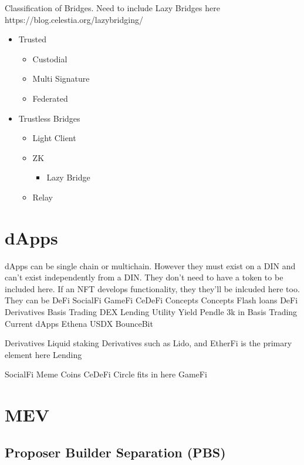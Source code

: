 \documentclass[
  letterpaper,
  DIV=11,
  numbers=noendperiod]{scrreprt}
\providecommand{\tightlist}{%
  \setlength{\itemsep}{0pt}\setlength{\parskip}{0pt}}\usepackage{longtable,booktabs,array}
\begin{document}
Classification of Bridges. Need to include Lazy Bridges here
https://blog.celestia.org/lazybridging/

\begin{itemize}
\tightlist
\item
  Trusted

  \begin{itemize}
  \tightlist
  \item
    Custodial
  \item
    Multi Signature
  \item
    Federated
  \end{itemize}
\item
  Trustless Bridges

  \begin{itemize}
  \tightlist
  \item
    Light Client
  \item
    ZK

    \begin{itemize}
    \tightlist
    \item
      Lazy Bridge
    \end{itemize}
  \item
    Relay
  \end{itemize}
\end{itemize}

\chapter{dApps}\label{dapps}

dApps can be single chain or multichain. However they must exist on a
DIN and can't exist independently from a DIN. They don't need to have a
token to be included here. If an NFT develops functionality, they
they'll be inlcuded here too. They can be DeFi SocialFi GameFi CeDeFi
Concepts Concepts Flash loans DeFi Derivatives Basis Trading DEX Lending
Utility Yield Pendle 3k in Basis Trading Current dApps Ethena USDX
BounceBit

Derivatives Liquid staking Derivatives such as Lido, and EtherFi is the
primary element here Lending

SocialFi Meme Coins CeDeFi Circle fits in here GameFi

\chapter{MEV}\label{mev}

\section{Proposer Builder Separation
(PBS)}\label{proposer-builder-separation-pbs}
\end{document}
